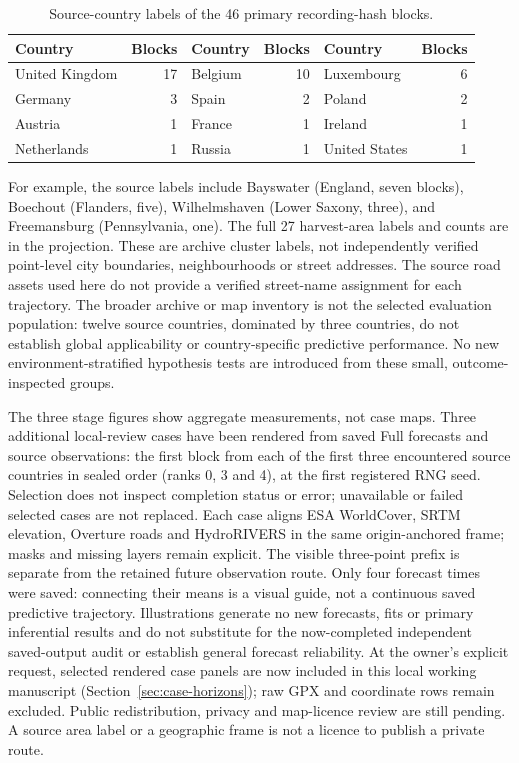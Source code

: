 \begin{table}[htbp]
\centering\small
\caption{Source-country labels of the 46 primary recording-hash blocks.}
\label{tab:geographic-blocks}\hypertarget{tab:geographic-blocks}{}
\begin{tabular}{lr lr lr}
\toprule
Country & Blocks & Country & Blocks & Country & Blocks\\
\midrule
United Kingdom & 17 & Belgium & 10 & Luxembourg & 6\\
Germany & 3 & Spain & 2 & Poland & 2\\
Austria & 1 & France & 1 & Ireland & 1\\
Netherlands & 1 & Russia & 1 & United States & 1\\
\bottomrule
\end{tabular}
\end{table}

For example, the source labels include Bayswater (England, seven blocks),
Boechout (Flanders, five), Wilhelmshaven (Lower Saxony, three), and
Freemansburg (Pennsylvania, one). The full 27 harvest-area labels and counts
are in the projection. These are archive cluster labels, not independently
verified point-level city boundaries, neighbourhoods or street addresses.
The source road assets used here do not provide a verified street-name
assignment for each trajectory. The broader archive or map inventory is not
the selected evaluation population: twelve source countries, dominated by
three countries, do not establish global applicability or country-specific
predictive performance. No new environment-stratified hypothesis tests are
introduced from these small, outcome-inspected groups.

The three stage figures show aggregate measurements, not case maps. Three
additional local-review cases have been rendered from saved Full forecasts
and source observations: the first block from each of the first three
encountered source countries in sealed order (ranks 0, 3 and 4), at the first
registered RNG seed. Selection does not inspect completion status or error;
unavailable or failed selected cases are not replaced. Each case aligns ESA
WorldCover, SRTM elevation, Overture roads and HydroRIVERS in the same
origin-anchored frame; masks and missing layers remain explicit. The visible
three-point prefix is separate from the retained future observation route.
Only four forecast times were saved: connecting their means is a visual
guide, not a continuous saved predictive trajectory. Illustrations generate
no new forecasts, fits or primary inferential results and do not substitute
for the now-completed independent saved-output audit or establish general
forecast reliability. At the owner's explicit
request, selected rendered case panels are now included in this local working
manuscript (Section~\ref{sec:case-horizons}); raw GPX and coordinate rows
remain excluded. Public redistribution, privacy and map-licence review are
still pending. A source area label or a geographic frame is not a licence
to publish a private route.



